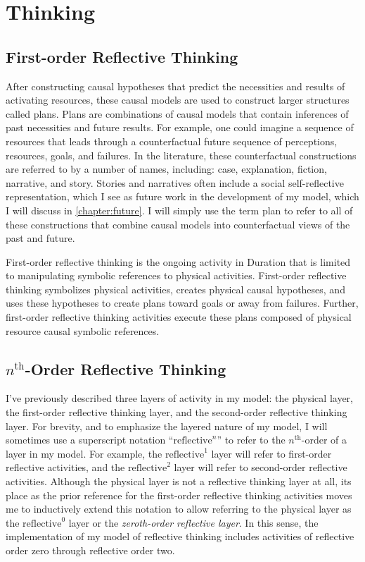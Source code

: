 \chapter{Thinking}
\label{chapter:thinking}

\section{First-order Reflective Thinking}

After constructing causal hypotheses that predict the necessities and
results of activating resources, these causal models are used to
construct larger structures called plans.  Plans are combinations of
causal models that contain inferences of past necessities and future
results.  For example, one could imagine a sequence of resources that
leads through a counterfactual future sequence of perceptions,
resources, goals, and failures.  In the literature, these
counterfactual constructions are referred to by a number of names,
including: case, explanation, fiction, narrative, and story.  Stories
and narratives often include a social self-reflective representation,
which I see as future work in the development of my model, which I
will discuss in \autoref{chapter:future}.  I will simply use the term
plan to refer to all of these constructions that combine causal models
into counterfactual views of the past and future.

First-order reflective thinking is the ongoing activity in Duration
that is limited to manipulating symbolic references to physical
activities.  First-order reflective thinking symbolizes physical
activities, creates physical causal hypotheses, and uses these
hypotheses to create plans toward goals or away from failures.
Further, first-order reflective thinking activities execute these
plans composed of physical resource causal symbolic references.

\section{$n^\text{th}$-Order Reflective Thinking}

I've previously described three layers of activity in my model: the
physical layer, the first-order reflective thinking layer, and the
second-order reflective thinking layer.  For brevity, and to emphasize
the layered nature of my model, I will sometimes use a superscript
notation ``$\text{reflective}^n$'' to refer to the $n^\text{th}$-order
of a layer in my model.  For example, the $\text{reflective}^1$ layer
will refer to first-order reflective activities, and the
$\text{reflective}^2$ layer will refer to second-order reflective
activities.  Although the physical layer is not a reflective thinking
layer at all, its place as the prior reference for the first-order
reflective thinking activities moves me to inductively extend this
notation to allow referring to the physical layer as the
$\text{reflective}^0$ layer or the \emph{zeroth-order reflective
  layer}.  In this sense, the implementation of my model of reflective
thinking includes activities of reflective order zero through
reflective order two.

